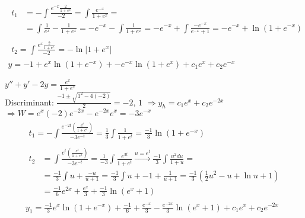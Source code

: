 \documentclass[twoside]{amsart}
\theoremstyle{plain}
\theoremstyle{definition}
\newcommand{\exercisehead}[1]
  {\smallskip
   \noindent{\small\bf Exercise #1.}}
\begin{document}
\[
\begin{gathered}
  \begin{aligned}
    t_1 & = - \int \frac{ e^{-x} \frac{2}{1+e^x} }{ -2} = \int \frac{e^{-x}}{1+e^x} = \\
    & = \int \frac{1}{e^x} - \frac{1}{ 1+e^x}  = -e^{-x} - \int \frac{1}{1+e^x} = -e^{-x} + \int \frac{-e^{-x}}{ e^{-x} + 1 } = -e^{-x} + \ln{(1+e^{-x}) } 
    \end{aligned} \\
  \begin{aligned}
t_2 = \int \frac{ e^x \frac{2}{1+e^x} }{ -2 } = -\ln{ |1+e^x | } 
\end{aligned} \\
  \boxed{ y = -1 + e^x \ln{ (1+e^{-x})} + -e^{-x} \ln{ (1+e^x) } + c_1 e^x + c_2 e^{-x} }
\end{gathered}
\]

\exercisehead{16} $y''  +y' - 2y = \frac{e^x}{1+e^x} $ \medskip \\
Discriminant: $ \frac{-1 \pm \sqrt{ 1^2 - 4 (-2) }}{ 2 } = -2, \, 1$ \quad $\Longrightarrow y_h = c_1 e^x + c_2 e^{-2x}$ \quad \, $\Longrightarrow W = e^x (-2)e^{-2x} - e^{-2x} e^x = -3 e^{-x} $ 
\[
\begin{gathered}
  \begin{aligned}
    t_1 = - \int \frac{e^{-2t} \left( \frac{e^t}{ 1 + e^t} \right) }{ -3 e^{-t} } = \frac{1}{3} \int \frac{1}{1 + e^t } = \frac{-1}{3} \ln{ (1+e^{-x})} 
  \end{aligned} \\
  \begin{aligned}
    t_2 & = \int \frac{e^t \left( \frac{e^t}{ 1 + e^t} \right) }{ -3e^{-t} } = \frac{1}{-3} \int \frac{e^{3t}}{ 1 + e^t} \xrightarrow{ u =e^t} \frac{-1}{3} \int \frac{ u^2 du }{ 1 + u } = \\ 
    & = \frac{-1}{3} \int u + \frac{-u}{u+1} = \frac{-1}{3} \int u + -1 + \frac{1}{u+1} = \frac{-1}{3} (\frac{1}{2} u^2 - u + \ln{u+1} ) \\
    & = \frac{-1}{6} e^{2x} + \frac{e^x}{3} + \frac{-1}{3} \ln{ (e^x + 1 ) } 
  \end{aligned} \\
  \boxed{ y_1 = \frac{-1}{3} e^x \ln{ (1+e^{-x}) } + \frac{-1}{6} + \frac{e^{-x}}{3} - \frac{e^{-2x}}{3} \ln{ (e^x+ 1 ) } + c_1 e^x + c_2 e^{-2x} }
\end{gathered}
\]
\end{document}
